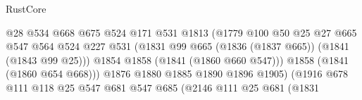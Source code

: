 \begin{lexlean}{RustCore}
\begin{coremodule}
                                              @28
                                              @534
                                              @668
                                              @675
                                              @524
                                              @171
                                              @531
                                              @1813
                                              (@1779
                                                @100
                                                @50
                                                @25
                                                @27
                                                @665
                                                @547
                                                @564
                                                @524
                                                @227
                                                @531
                                                (@1831
                                                  @99
                                                  @665
                                                  (@1836 (@1837 @665))
                                                  (@1841 (@1843 @99 @25)))
                                                @1854
                                                @1858
                                                (@1841 (@1860 @660 @547)))
                                              @1858
                                              (@1841 (@1860 @654 @668)))
                                            @1876
                                            @1880
                                            @1885
                                            @1890
                                            @1896
                                            @1905)
                                          (@1916
                                            @678
                                            @111
                                            @118
                                            @25
                                            @547
                                            @681
                                            @547
                                            @685
                                            (@2146
                                              @111
                                              @25
                                              @681
                                              (@1831

\end{coremodule}
\end{lexlean}
